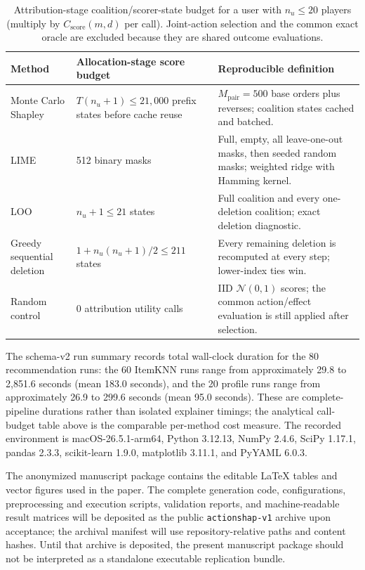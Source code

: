 \documentclass[a4paper,fleqn,doubleblind]{cas-sc}
\begin{document}
\begin{table}[t]
\centering\small
\caption{Attribution-stage coalition/scorer-state budget for a user with $n_u\le20$ players (multiply by $C_{\mathrm{score}}(m,d)$ per call). Joint-action selection and the common exact oracle are excluded because they are shared outcome evaluations.}
\label{tab:computational-cost}
\begin{tabular}{@{}p{}p{}p{}@{}}
\toprule
Method & Allocation-stage score budget & Reproducible definition \\
\midrule
Monte Carlo Shapley & $T(n_u+1)\le21{,}000$ prefix states before cache reuse & $M_{\mathrm{pair}}=500$ base orders plus reverses; coalition states cached and batched. \\
LIME & 512 binary masks & Full, empty, all leave-one-out masks, then seeded random masks; weighted ridge with Hamming kernel. \\
LOO & $n_u+1\le21$ states & Full coalition and every one-deletion coalition; exact deletion diagnostic. \\
Greedy sequential deletion & $1+n_u(n_u+1)/2\le211$ states & Every remaining deletion is recomputed at every step; lower-index ties win. \\
Random control & 0 attribution utility calls & IID $\mathcal{N}(0,1)$ scores; the common action/effect evaluation is still applied after selection. \\
\bottomrule
\end{tabular}
\end{table}

The schema-v2 run summary records total wall-clock duration for the 80 recommendation runs: the 60 ItemKNN runs range from approximately 29.8 to 2,851.6 seconds (mean 183.0 seconds), and the 20 profile runs range from approximately 26.9 to 299.6 seconds (mean 95.0 seconds). These are complete-pipeline durations rather than isolated explainer timings; the analytical call-budget table above is the comparable per-method cost measure. The recorded environment is macOS-26.5.1-arm64, Python 3.12.13, NumPy 2.4.6, SciPy 1.17.1, pandas 2.3.3, scikit-learn 1.9.0, matplotlib 3.11.1, and PyYAML 6.0.3. 

The anonymized manuscript package contains the editable LaTeX tables and vector figures used in the paper. The complete generation code, configurations, preprocessing and execution scripts, validation reports, and machine-readable result matrices will be deposited as the public \texttt{actionshap-v1} archive upon acceptance; the archival manifest will use repository-relative paths and content hashes. Until that archive is deposited, the present manuscript package should not be interpreted as a standalone executable replication bundle.
\end{document}

